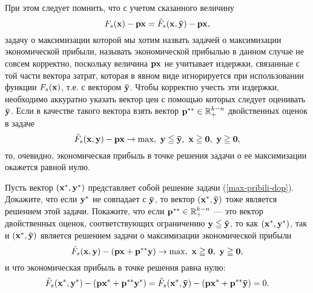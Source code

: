     При этом следует помнить, что с учетом сказанного величину
\[
    F_{s}(\mathbf{x})-\mathbf{p}\mathbf{x}=\tilde{F}_{s}(\mathbf{x},\mathbf{\bar{y}})-\mathbf{p}\mathbf{x},
\]
    задачу о максимизации которой мы
    хотим назвать задачей о максимизации экономической прибыли,
    называть экономической прибылью в данном случае не совсем
    корректно, поскольку величина $\mathbf{p}\mathbf{x}$ не учитывает
    издержки, связанные с той части вектора затрат,
    которая в явном виде игнорируется при использовании функции
    $F_{s}(\mathbf{x})$, т.е. с вектором $\mathbf{\bar{y}}$.
    Чтобы корректно учесть эти издержки, необходимо аккуратно
    указать вектор цен с помощью которых следует оценивать
    $\mathbf{\bar{y}}$. Если в качестве такого вектора  взять
    вектор $\mathbf{p^{**}}\in\mathbb{R}^{k-n}_{+}$
    двойственных оценок в задаче
\begin{equation}\label{max-pribili-dop}
    \tilde{F}_{s}(\mathbf{x},\mathbf{y})-\mathbf{p}\mathbf{x}\rightarrow\max,
    \ \mathbf{y}\leqq\mathbf{\bar{y}},
    \ \mathbf{x}\geqq\mathbf{0}, \ \mathbf{y}\geqq\mathbf{0},
\end{equation}
    то, очевидно, экономическая прибыль в точке решения задачи о ее
    максимизации окажется равной нулю.


\begin{exer}
    Пусть вектор $(\mathbf{x^{*}},\mathbf{y^{*}})$ представляет собой
    решение задачи (\ref{max-pribili-dop}). Докажите, что если
    $\mathbf{y^{*}}$ не совпадает с $\mathbf{\bar{y}}$, то вектор
    $(\mathbf{x^{*}},\mathbf{\bar{y}})$ тоже является решением этой задачи.
    Покажите, что если $\mathbf{p^{**}}\in\mathbb{R}^{k-n}_{+}$ --- это вектор
    двойственных оценок, соответствующих ограничению
    $\mathbf{y}\leqq\mathbf{\bar{y}}$, то как $(\mathbf{x^{*}},\mathbf{y^{*}})$, так
    и $(\mathbf{x^{*}},\mathbf{\bar{y}})$ является решением задачи о
    максимизации экономической прибыли
\[
    \tilde{F}_{s}(\mathbf{x},\mathbf{y})-(\mathbf{p}\mathbf{x}+\mathbf{p^{**}}\mathbf{y})\rightarrow\max,
    \ \mathbf{x}\geqq\mathbf{0}, \ \mathbf{y}\geqq\mathbf{0},
\]
    и что экономическая прибыль в точке решения равна нулю:
\[
    \tilde{F}_{s}(\mathbf{x^{*}},\mathbf{y^{*}})-(\mathbf{p}\mathbf{x^{*}}+\mathbf{p^{**}}\mathbf{y^{*}})
    =\tilde{F}_{s}(\mathbf{x^{*}},\mathbf{\bar{y}})-(\mathbf{p}\mathbf{x^{*}}+\mathbf{p^{**}}\mathbf{\bar{y}})=0.
\]
\end{exer}































\
